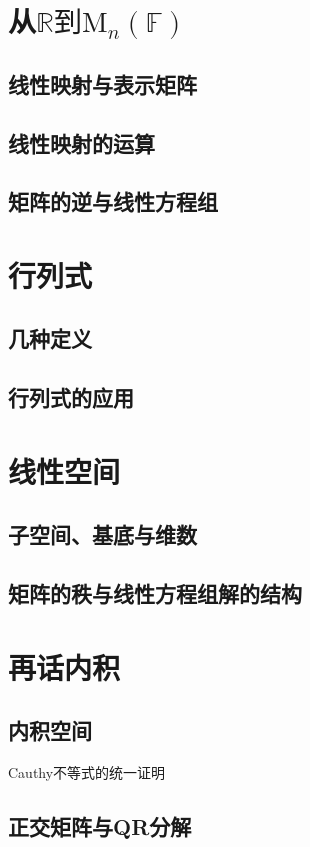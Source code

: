 \section{从\texorpdfstring{$\mathbb{R}\text{到}\mathrm{M}_n(\mathbb{F})$}s}
\clearpage
\subsection{线性映射与表示矩阵}
\clearpage
\subsection{线性映射的运算}
\clearpage
\subsection{矩阵的逆与线性方程组}
\clearpage

\section{行列式}
\subsection{几种定义}
\clearpage
\subsection{行列式的应用}
\clearpage

\section{线性空间}
\subsection{子空间、基底与维数}
\clearpage
\subsection{矩阵的秩与线性方程组解的结构}
\clearpage

\section{再话内积}
\subsection{内积空间}
Cauthy不等式的统一证明
\subsection{正交矩阵与QR分解}
\clearpage
